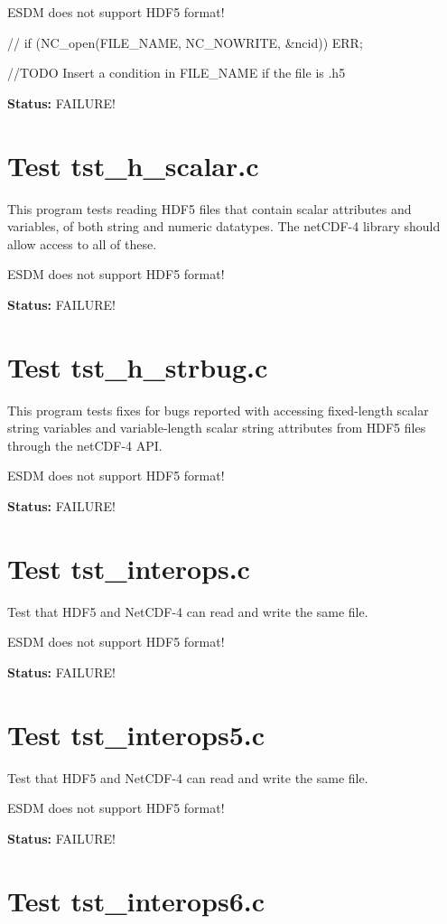 ESDM does not support HDF5 format!

// if (NC\_open(FILE\_NAME, NC\_NOWRITE, \&ncid)) ERR;

//TODO Insert a condition in FILE\_NAME if the file is .h5

{\bf \large Status: } FAILURE!

\section{Test tst\_h\_scalar.c}

This program tests reading HDF5 files that contain scalar attributes and variables, of both string and numeric datatypes.  The netCDF-4 library should allow access to all of these.

ESDM does not support HDF5 format!

{\bf \large Status: } FAILURE!

\section{Test tst\_h\_strbug.c}

This program tests fixes for bugs reported with accessing fixed-length scalar string variables and variable-length scalar string attributes from HDF5 files through the netCDF-4 API.

ESDM does not support HDF5 format!

{\bf \large Status: } FAILURE!

\section{Test tst\_interops.c}

Test that HDF5 and NetCDF-4 can read and write the same file.

ESDM does not support HDF5 format!

{\bf \large Status: } FAILURE!

\section{Test tst\_interops5.c}

Test that HDF5 and NetCDF-4 can read and write the same file.

ESDM does not support HDF5 format!

{\bf \large Status: } FAILURE!

\section{Test tst\_interops6.c}

